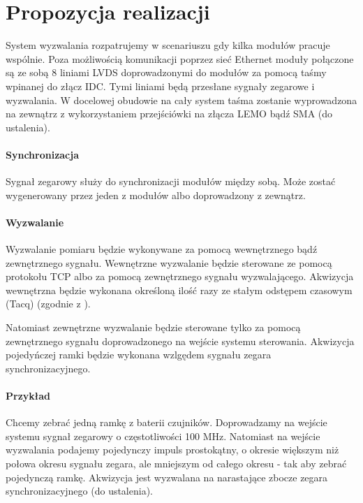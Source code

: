 \documentclass[a4paper,11pt,oneside]{article}  %
\begin{document}
\section{Propozycja realizacji}

System wyzwalania rozpatrujemy w scenariuszu gdy kilka modułów pracuje wspólnie. Poza możliwością komunikacji poprzez sieć Ethernet moduły połączone są ze sobą 8 liniami LVDS doprowadzonymi do modułów za pomocą taśmy wpinanej do złącz IDC. Tymi liniami będą przesłane sygnały zegarowe i wyzwalania. W docelowej obudowie na cały system taśma zostanie wyprowadzona na zewnątrz z wykorzystaniem przejściówki na złącza LEMO bądź SMA (do ustalenia). 

\paragraph{Synchronizacja}
Sygnał zegarowy służy do synchronizacji modułów między sobą. Może zostać wygenerowany przez jeden z modułów albo doprowadzony z zewnątrz. 

\paragraph{Wyzwalanie}

Wyzwalanie pomiaru będzie wykonywane za pomocą wewnętrznego bądź zewnętrznego sygnału. Wewnętrzne wyzwalanie będzie sterowane ze pomocą protokołu TCP albo za pomocą zewnętrznego sygnału wyzwalającego. Akwizycja wewnętrzna będzie wykonana określoną ilość razy ze stałym odstępem czasowym (Tacq) (zgodnie z \cite{SPEC}). 

Natomiast zewnętrzne wyzwalanie będzie sterowane tylko za pomocą zewnętrznego sygnału doprowadzonego na wejście systemu sterowania. Akwizycja pojedyńczej ramki będzie wykonana wzlgędem sygnału zegara synchronizacyjnego. 

\paragraph{Przykład}
Chcemy zebrać jedną ramkę z baterii czujników. Doprowadzamy na wejście systemu sygnał zegarowy o częstotliwości 100 MHz. Natomiast na wejście wyzwalania podajemy pojedynczy impuls prostokątny, o okresie większym niż połowa okresu sygnału zegara, ale mniejszym od całego okresu - tak aby zebrać pojedynczą ramkę. Akwizycja jest wyzwalana na narastające zbocze zegara synchronizacyjnego (do ustalenia).
\end{document}
